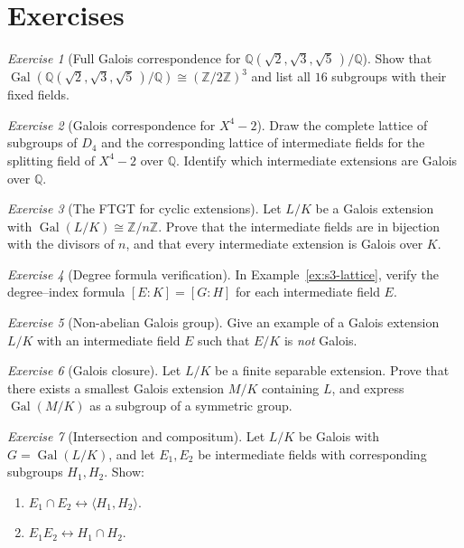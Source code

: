 \documentclass[12pt,a4paper,openany]{book}
\theoremstyle{definition}
\theoremstyle{remark}
\newtheorem{exercise}{Exercise}[chapter]
\newcommand{\Z}{\mathbb{Z}}
\newcommand{\Q}{\mathbb{Q}}
\DeclareMathOperator{\Gal}{Gal}
\begin{document}
\section{Exercises}
\label{sec:ch12-exercises}

\begin{exercise}[Full Galois correspondence for $\Q(\sqrt{2},\sqrt{3},\sqrt{5}\,)/\Q$]
\label{exo:three-sqrt}
Show that $\Gal(\Q(\sqrt{2},\sqrt{3},\sqrt{5}\,)/\Q)\cong(\Z/2\Z)^{3}$
and list all $16$ subgroups with their fixed fields.
\end{exercise}

\begin{exercise}[Galois correspondence for $X^{4}-2$]\label{exo:x4-2-lattice}
Draw the complete lattice of subgroups of $D_{4}$ and the corresponding
lattice of intermediate fields for the splitting field of $X^{4}-2$ over
$\Q$.  Identify which intermediate extensions are Galois over $\Q$.
\end{exercise}

\begin{exercise}[The FTGT for cyclic extensions]\label{exo:ftgt-cyclic}
Let $L/K$ be a Galois extension with $\Gal(L/K)\cong\Z/n\Z$.  Prove that
the intermediate fields are in bijection with the divisors of $n$, and that
every intermediate extension is Galois over $K$.
\end{exercise}

\begin{exercise}[Degree formula verification]\label{exo:deg-formula}
In Example~\ref{ex:s3-lattice}, verify the degree--index formula
$[E:K]=[G:H]$ for each intermediate field $E$.
\end{exercise}

\begin{exercise}[Non-abelian Galois group]\label{exo:non-abelian}
Give an example of a Galois extension $L/K$ with an intermediate field $E$
such that $E/K$ is \emph{not} Galois.
\end{exercise}

\begin{exercise}[Galois closure]\label{exo:galois-closure}
Let $L/K$ be a finite separable extension.  Prove that there exists a
smallest Galois extension $M/K$ containing $L$, and express $\Gal(M/K)$
as a subgroup of a symmetric group.
\end{exercise}

\begin{exercise}[Intersection and compositum]\label{exo:intersection-compositum}
Let $L/K$ be Galois with $G=\Gal(L/K)$, and let $E_{1},E_{2}$ be
intermediate fields with corresponding subgroups $H_{1},H_{2}$.  Show:
\begin{enumerate}
\item $E_{1}\cap E_{2}\longleftrightarrow\langle H_{1},H_{2}\rangle$.
\item $E_{1}E_{2}\longleftrightarrow H_{1}\cap H_{2}$.
\end{enumerate}
\end{exercise}
\end{document}
